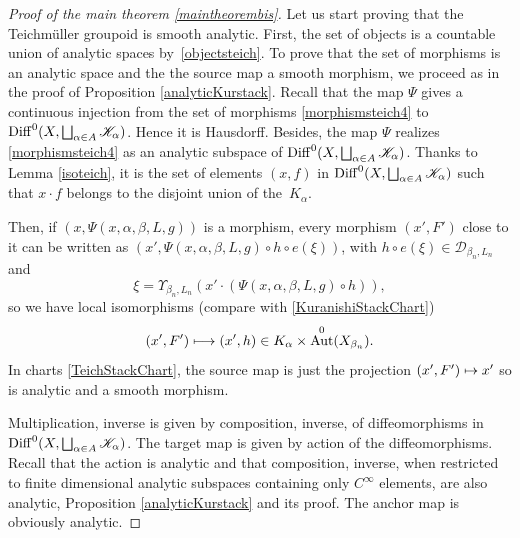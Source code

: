 \documentclass[10pt]{amsart}
\let\mathcal\mathscr
\let\oldbigsqcup\bigsqcup
\renewcommand{\bigsqcup}{\mathop{\textstyle\oldbigsqcup}\displaylimits}
\def\mto{\mathchoice{\longmapsto}{\mapsto}{\mapsto}{\mapsto}}
\DeclareMathOperator{\Aut}{Aut}
\DeclareMathOperator{\Diff}{Diff}
\theoremstyle{plain}
\theoremstyle{definition}
\theoremstyle{remark}
\numberwithin{equation}{section}
\newcommand{\DK}{\Diff^0(X,\bigsqcup_{\alpha\in A}\mathcal K_\alpha)}
\begin{document}
\begin{proof}[Proof of the main theorem \ref{maintheorembis}]
Let us start proving that the Teichmüller groupoid is smooth analytic. First, the set of objects is a countable union of analytic spaces by~\eqref{objectsteich}. To prove that the set of morphisms is an analytic space and the the source map a smooth morphism, we proceed as in the proof of Proposition \ref{analyticKurstack}. Recall that the map $\Psi$ gives a continuous injection from the set of morphisms \eqref{morphismsteich4} to $\DK$. Hence it is Hausdorff. Besides, the map $\Psi$ realizes \eqref{morphismsteich4} as an analytic subspace of $\DK$. Thanks to Lemma \ref{isoteich}, it is the set of elements $(x,f)$ in $\DK$ such that $x\cdot f$ belongs to the disjoint union of the~$K_\alpha$.

Then, if $(x,\Psi(x,\alpha,\beta, L,g))$ is a morphism, every morphism $(x',F')$ close to it can be written as $(x',\Psi(x,\alpha,\beta, L,g)\circ h\circ e(\xi))$, with $h\circ e(\xi)\in \mathcal D_{\beta_n,L_n}$ and
\begin{equation}
\label{xichart}
\xi=\Upsilon_{\beta_n,L_n}(x'\cdot (\Psi(x,\alpha,\beta, L,g)\circ h)),
\end{equation}
so we have local isomorphisms (compare with \eqref{KuranishiStackChart})
\begin{equation}
\label{TeichStackChart}
(x',F')\mto (x',h)\in K_\alpha\times \Aut^0(X_{\beta_n}).
\end{equation}
In charts \eqref{TeichStackChart}, the source map is just the projection $(x',F')\mto x'$
so is analytic and a smooth morphism.

Multiplication, \resp inverse is given by composition, \resp inverse, of diffeomorphisms in $\DK$. The target map is given by action of the diffeomorphisms. Recall that the action is analytic and that composition, \resp inverse, when restricted to finite dimensional analytic subspaces containing only $C^\infty$ elements, are also analytic, \cf Proposition \ref{analyticKurstack} and its proof. The anchor map is obviously analytic.


\end{proof}
\end{document}
